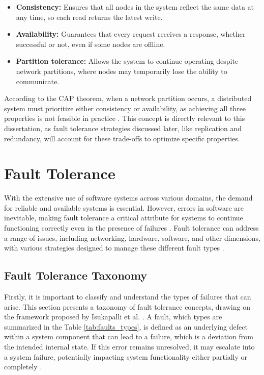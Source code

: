 \begin{itemize}
    \item \textbf{Consistency:} Ensures that all nodes in the system reflect the same data at any time, so each read returns the latest write.
    \item \textbf{Availability:} Guarantees that every request receives a response, whether successful or not, even if some nodes are offline.
    \item \textbf{Partition tolerance:} Allows the system to continue operating despite network partitions, where nodes may temporarily lose the ability to communicate.
\end{itemize}

According to the CAP theorem, when a network partition occurs, a distributed system must prioritize either consistency or availability, as achieving all three properties is not feasible in practice \cite{Tanenbaum2023, ibm-cap-theorem, Vitillo2021}. This concept is directly relevant to this dissertation, as fault tolerance strategies discussed later, like replication and redundancy, will account for these trade-offs to optimize specific properties.


\section{Fault Tolerance}

With the extensive use of software systems across various domains, the demand for reliable and available systems is essential. However, errors in software are inevitable, making fault tolerance a critical attribute for systems to continue functioning correctly even in the presence of failures \cite{Sari2015}. Fault tolerance can address a range of issues, including networking, hardware, software, and other dimensions, with various strategies designed to manage these different fault types \cite{Tanenbaum2023,Noor2019}.

\subsection{Fault Tolerance Taxonomy}

Firstly, it is important to classify and understand the types of failures that can arise. This section presents a taxonomy of fault tolerance concepts, drawing on the framework proposed by Isukapalli et al. \cite{Isukapalli2024}. A fault, which types are summarized in the Table \ref{tab:faults_types}, is defined as an underlying defect within a system component that can lead to a failure, which is a deviation from the intended internal state. If this error remains unresolved, it may escalate into a system failure, potentially impacting system functionality either partially or completely \cite{Isukapalli2024,Reghenzani2023}.

